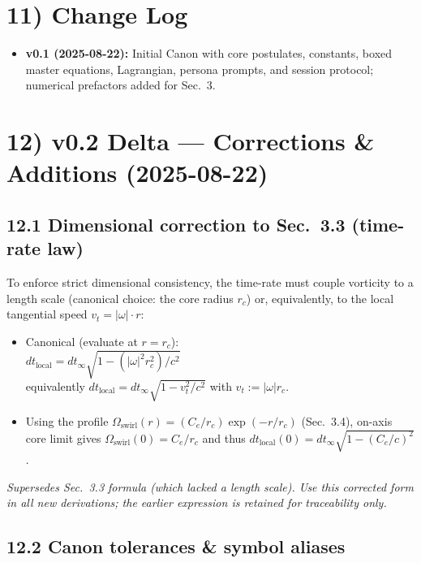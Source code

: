 \documentclass[11pt]{article}
\begin{document}
\section*{11) Change Log}

\begin{itemize}
    \item \textbf{v0.1 (2025-08-22):} Initial Canon with core postulates, constants, boxed master equations, Lagrangian, persona prompts, and session protocol; numerical prefactors added for Sec.~3.
\end{itemize}

\section*{12) v0.2 Delta --- Corrections \& Additions (2025-08-22)}

\subsection*{12.1 Dimensional correction to Sec.~3.3 (time-rate law)}

To enforce strict dimensional consistency, the time-rate must couple vorticity to a length scale (canonical choice: the core radius $r_c$) or, equivalently, to the local tangential speed $v_t = |\omega| \cdot r$:

\begin{itemize}
    \item Canonical (evaluate at $r = r_c$):\\
    $dt_{\text{local}} = dt_{\infty} \sqrt{1 - (|\omega|^2 r_c^2)/c^2}$\\
    equivalently $dt_{\text{local}} = dt_{\infty} \sqrt{1 - v_t^2/c^2}$ with $v_t := |\omega| r_c$.
    \item Using the profile $\Omega_{\text{swirl}}(r) = (C_e/r_c) \exp(-r/r_c)$ (Sec.~3.4), on-axis core limit gives $\Omega_{\text{swirl}}(0) = C_e/r_c$ and thus $dt_{\text{local}}(0) = dt_{\infty} \sqrt{1 - (C_e/c)^2}$.
\end{itemize}

\textit{Supersedes Sec.~3.3 formula (which lacked a length scale). Use this corrected form in all new derivations; the earlier expression is retained for traceability only.}

\subsection*{12.2 Canon tolerances \& symbol aliases}
\end{document}
